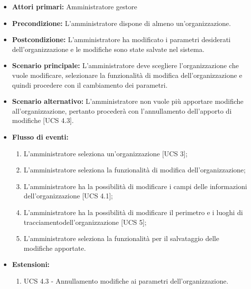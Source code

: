 \begin{itemize}
    \item \textbf{Attori primari:} Amministratore gestore
    \item \textbf{Precondizione:} L'amministratore dispone di almeno un'organizzazione.
    \item \textbf{Postcondizione:} L'amministratore ha modificato i parametri desiderati dell'organizzazione e le modifiche sono state salvate nel sistema.
    \item \textbf{Scenario principale:} L'amministratore deve scegliere l'organizzazione che vuole modificare, selezionare la funzionalità di modifica dell'organizzazione e quindi procedere con il cambiamento dei parametri.
    \item \textbf{Scenario alternativo:} L'amministratore non vuole più apportare modifiche all'organizzazione, pertanto procederà con l'annullamento dell'apporto di modifiche [UCS 4.3].
    \item \textbf{Flusso di eventi:}
    \begin{enumerate}
        \item L'amministratore seleziona un'organizzazione [UCS 3];
        \item L'amministratore seleziona la funzionalità di modifica dell'organizzazione;
        \item L'amministratore ha la possibilità di modificare i campi delle informazioni dell'organizzazione [UCS 4.1];
        \item L'amministratore ha la possibilità di modificare il perimetro e i luoghi di tracciamentodell'organizzazione [UCS 5];
        \item L'amministratore seleziona la funzionalità per il salvataggio delle modifiche apportate.
    \end{enumerate}
    \item \textbf{Estensioni:}
    \begin{enumerate}
        \item UCS 4.3 - Annullamento modifiche ai parametri dell'organizzazione.
    \end{enumerate}
\end{itemize}

